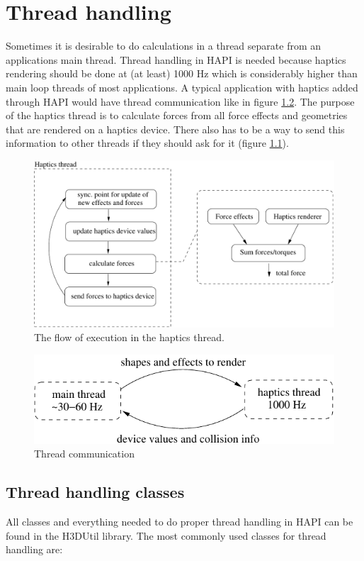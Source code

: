 \chapter{Thread handling}

Sometimes it is desirable to do calculations in a thread separate from an
applications main thread. Thread handling in HAPI is needed because haptics
rendering should be done at (at least) 1000 Hz which is considerably higher
than main loop threads of most applications. A typical application with haptics
added through HAPI would have thread communication like in figure \ref{threads}.
The purpose of the haptics thread is to calculate forces from all force effects
and geometries that are rendered on a haptics device. There also has to be a way
to send this information to other threads if they should ask for it (figure
\ref{haptics thread}).

\begin{figure} 
  \centering 
  \includegraphics{images/hapticsthread.pdf}
  \caption{The flow of execution in the haptics thread.}
  \label{haptics thread} 
\end{figure}

\begin{figure} 
  \centering 
  \includegraphics{images/threads.pdf}
  \caption{Thread communication}
  \label{threads} 
\end{figure}

\section{Thread handling classes}
All classes and everything needed to do proper thread handling in HAPI can be
found in the H3DUtil library. The most commonly used
classes for thread handling are:

